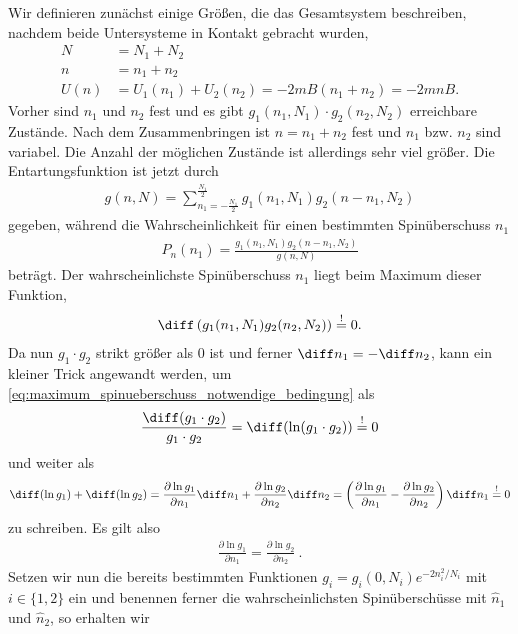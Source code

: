Wir definieren zunächst einige Größen, die das Gesamtsystem beschreiben, nachdem beide Untersysteme in Kontakt gebracht wurden,
\begin{align*}
    N    & = N_1+N_2                                 \\
    n    & = n_1+n_2                                 \\
    U(n) & =U_1(n_1)+U_2(n_2) = -2mB(n_1+n_2)=-2mnB.
\end{align*}
Vorher sind $n_1$ und $n_2$ fest und es gibt $g_1(n_1,N_1)\cdot g_2(n_2,N_2)$ erreichbare Zustände. Nach dem Zusammenbringen ist $n=n_1+n_2$ fest und $n_1$ bzw. $n_2$ sind variabel. Die Anzahl der möglichen Zustände ist allerdings sehr viel größer. Die Entartungsfunktion ist jetzt durch
\begin{align*}
    g(n,N) = \sum_{n_1=-\frac{N_1}{2}}^{\frac{N_1}{2}} g_1(n_1,N_1)g_2(n-n_1,N_2)
\end{align*}
gegeben, während die Wahrscheinlichkeit für einen bestimmten Spinüberschuss $n_1$
\begin{align*}
    P_n(n_1) = \frac{g_1(n_1,N_1)g_2(n-n_1,N_2)}{g(n,N)}
\end{align*}
beträgt. Der wahrscheinlichste Spinüberschuss $n_1$ liegt beim Maximum dieser Funktion,
\begin{align}
    \label{eq:maximum_spinueberschuss_notwendige_bedingung}
    \diff \left(g_1(n_1,N_1)g_2(n_2,N_2)\right) \overset{!}{=} 0. 
\end{align}
Da nun $g_1\cdot g_2$ strikt größer als $0$ ist und ferner $\diff n_1=-\diff n_2$, kann ein kleiner Trick angewandt werden, um \eqref{eq:maximum_spinueberschuss_notwendige_bedingung} als 
\begin{align*}
    \frac{\diff(g_1\cdot g_2)}{g_1\cdot g_2}=\diff(\ln(g_1\cdot g_2)) \overset{!}{=} 0
\end{align*}
und weiter als 
\begin{align*}
    \diff(\ln g_1) + \diff(\ln g_2) = \frac{\partial \ln g_1}{\partial n_1} \diff n_1 + \frac{\partial \ln g_2}{\partial n_2} \diff n_2 = \left(\frac{\partial \ln g_1}{\partial n_1} - \frac{\partial \ln g_2}{\partial n_2}\right) \diff n_1  \overset{!}{=} 0
\end{align*}
zu schreiben. Es gilt also 
\begin{align}
    \label{eq:bedingung_wahrscheinlichster_spinueberschuss}
    \boxed{\frac{\partial \ln g_1}{\partial n_1}  = \frac{\partial \ln g_2}{\partial n_2} }\:.
\end{align}
Setzen wir nun die bereits bestimmten Funktionen $g_i=g_i(0,N_i) e^{-2n_i^2/N_i}$ mit $i\in\{1,2\}$ ein und benennen ferner die wahrscheinlichsten Spinüberschüsse mit $\hat{n}_1$ und $\hat{n}_2$, so erhalten wir 
